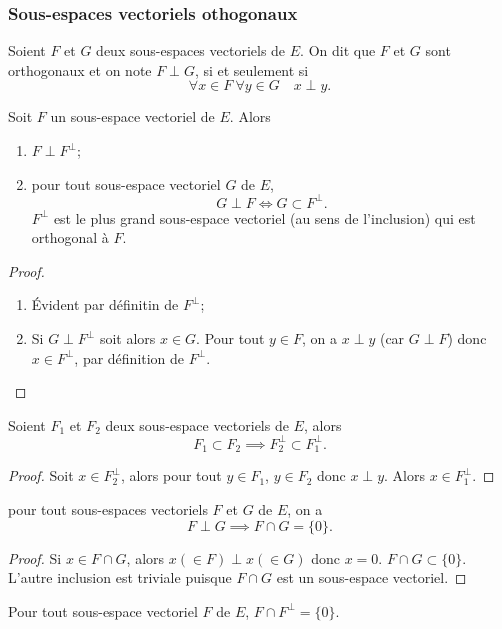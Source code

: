 \subsubsection{Sous-espaces vectoriels othogonaux}

\begin{defdef}
  Soient \(F\) et \(G\) deux sous-espaces vectoriels de \(E\). On dit que 
  \(F\) et \(G\) sont orthogonaux et on note \(F \perp G\), si et seulement si
  \begin{equation}
    \forall x \in F \ \forall y \in G \quad x \perp y.
  \end{equation}
\end{defdef}
\begin{prop}
  Soit \(F\) un sous-espace vectoriel de \(E\). Alors
  \begin{enumerate}
    \item \(F \perp F^\perp\);
    \item pour tout sous-espace vectoriel \(G\) de \(E\),
      \begin{equation}
        G \perp F \iff G \subset F^\perp.
      \end{equation}
      \(F^\perp\) est le plus grand sous-espace vectoriel (au sens de 
      l'inclusion) qui est orthogonal à \(F\).
  \end{enumerate}
\end{prop}
\begin{proof}
  \begin{enumerate}
    \item Évident par définitin de \(F^\perp\);
    \item Si \(G \perp F^\perp\) soit alors \(x \in G\). Pour tout \(y \in 
      F\), on a \(x \perp y\) (car \(G \perp F\)) donc \(x \in F^\perp\), par 
      définition de \(F^\perp\).
  \end{enumerate}
\end{proof}
\begin{prop}
  Soient \(F_1\) et \(F_2\) deux sous-espace vectoriels de \(E\), alors
  \begin{equation}
    F_1 \subset F_2 \implies F_2^\perp \subset F_1^\perp.
  \end{equation}
\end{prop}
\begin{proof}
  Soit \(x \in F_2^\perp\), alors pour tout \(y \in F_1\), \(y \in F_2\) donc 
  \(x \perp y\). Alors \(x \in F_1^\perp\).
\end{proof}
\begin{prop}
  pour tout sous-espaces vectoriels \(F\) et \(G\) de \(E\), on a
  \begin{equation}
    F \perp G \implies F \cap G = \{0\}.
  \end{equation}
\end{prop}
\begin{proof}
  Si \(x \in F \cap G\), alors \(x (\in F) \perp x (\in G)\) donc \(x=0\).  
  \(F \cap G \subset \{0\}\). L'autre inclusion est triviale puisque \(F \cap 
  G\) est un sous-espace vectoriel.
\end{proof}
\begin{cor}
  Pour tout sous-espace vectoriel \(F\) de \(E\), \(F \cap F^\perp =\{0\}\).
\end{cor}


